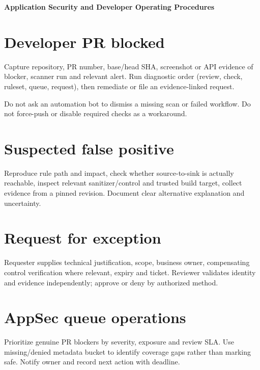 \documentclass[11pt,letterpaper]{article}
\begin{document}
\begin{center}
{\LARGE\bfseries Application Security and Developer Operating Procedures}\par
\vspace{5pt}{\large Practical action paths without bypassing controls}\par
\vspace{9pt}{\small Engineering reference | Proposed design | Not a deployment or approval record}\par
\end{center}
\tableofcontents
\clearpage
\section{Developer PR blocked}
Capture repository, PR number, base/head SHA, screenshot or API evidence of blocker, scanner run and relevant alert. Run diagnostic order (review, check, ruleset, queue, request), then remediate or file an evidence-linked request.

Do not ask an automation bot to dismiss a missing scan or failed workflow. Do not force-push or disable required checks as a workaround.


\section{Suspected false positive}
Reproduce rule path and impact, check whether source-to-sink is actually reachable, inspect relevant sanitizer/control and trusted build target, collect evidence from a pinned revision. Document clear alternative explanation and uncertainty.


\section{Request for exception}
Requester supplies technical justification, scope, business owner, compensating control verification where relevant, expiry and ticket. Reviewer validates identity and evidence independently; approve or deny by authorized method.


\section{AppSec queue operations}
Prioritize genuine PR blockers by severity, exposure and review SLA. Use missing/denied metadata bucket to identify coverage gaps rather than marking safe. Notify owner and record next action with deadline.
\end{document}
